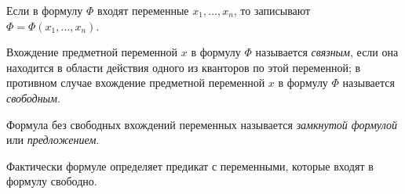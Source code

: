 \begin{definition}
    Если в формулу $\Phi$ входят переменные $x_1,\ldots,x_n$, то записывают $\Phi = \Phi(x_1,\ldots,x_n)$.

    Вхождение предметной переменной $x$ в формулу $\Phi$ называется \textit{связным}, если она находится в области действия одного из кванторов по этой переменной; в противном случае вхождение предметной переменной $x$ в формулу $\Phi$ называется \textit{свободным}.    

    Формула без свободных вхождений переменных называется \textit{замкнутой формулой} или \textit{предложением}.

    Фактически формуле определяет предикат с переменными, которые входят в формулу свободно.
\end{definition}

